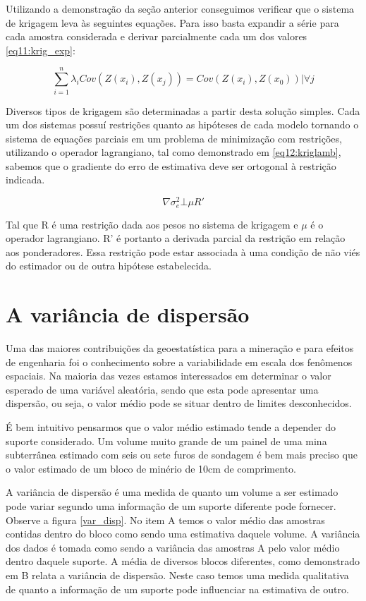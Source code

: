 Utilizando a demonstração da seção anterior conseguimos verificar que o sistema de krigagem leva às seguintes equações. Para isso basta expandir a série para cada amostra considerada e derivar parcialmente cada um dos valores \eqref{eq11:krig_exp}: 

\begin{equation}\label{eq11:krig_exp}
\sum_{i=1}^{n}\lambda _{i}Cov(Z(x_{i}),Z(x_{j}))= Cov(Z(x_{i}),Z(x_{0}))|\forall j
\end{equation}

Diversos tipos de krigagem são determinadas a partir desta solução simples. Cada um dos sistemas possuí restrições quanto as hipóteses de cada modelo tornando o sistema de equações parciais em um problema de minimização com restrições, utilizando o operador lagrangiano, tal como demonstrado em \eqref{eq12:kriglamb}, sabemos que o gradiente do erro de estimativa deve ser ortogonal à restrição indicada. 

\begin{equation}\label{eq12:kriglamb}
\nabla \sigma ^{2}_{e}\bot \mu R' 
\end{equation}

Tal que R é uma restrição dada aos pesos no sistema de krigagem e $\mu$ é o operador lagrangiano. R' é portanto a derivada parcial da restrição em relação aos ponderadores. Essa restrição pode estar associada à uma condição de não viés do estimador ou de outra hipótese estabelecida.  


\section{A variância de dispersão}

Uma das maiores contribuições da geoestatística para a mineração e para efeitos de engenharia foi o conhecimento sobre a variabilidade em escala dos fenômenos espaciais. Na maioria das vezes estamos interessados em determinar o valor esperado de uma variável aleatória, sendo que esta pode apresentar uma dispersão, ou seja, o valor médio pode se situar dentro de limites desconhecidos. 

É bem intuitivo pensarmos que o valor médio estimado tende a depender do suporte considerado. Um volume muito grande de um painel de uma mina subterrânea estimado com seis ou sete furos de sondagem é bem mais preciso que o valor estimado de um bloco de minério de 10cm de comprimento.

A variância de dispersão é uma medida de quanto um volume a ser estimado pode variar segundo uma informação de um suporte diferente pode fornecer. Observe a figura \ref{var_disp}. No item A temos o valor médio das amostras contidas dentro do bloco como sendo uma estimativa daquele volume. A variância dos dados é tomada como sendo a variância das amostras A pelo valor médio dentro daquele suporte. A média de diversos blocos diferentes, como demonstrado em B relata a variância de dispersão. Neste caso temos uma medida qualitativa de quanto a informação de um suporte pode influenciar na estimativa de outro. 

